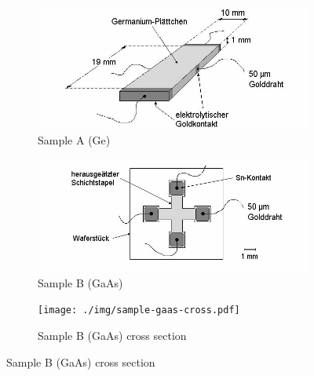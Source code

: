 \begin{figure}
	\centering
	\begin{subfigure}{0.45\textwidth}
		\centering
		\includegraphics[width=\textwidth]{./img/sample-ge.png}
		\caption{Sample A (Ge)}
		\label{fig:samples:ge}
	\end{subfigure}
	\begin{subfigure}{0.45\textwidth}
		\centering
		\includegraphics[width=\textwidth]{./img/sample-gaas-clover.png}
		\caption{Sample B (GaAs)}
		\label{fig:samples:gaas-clover}
	\end{subfigure}
  \par\bigskip
	\begin{subfigure}{0.7\textwidth}
		\centering
		\texttt{[image: ./img/sample-gaas-cross.pdf]}
		\caption{Sample B (GaAs) cross section}
		\label{fig:samples:gaas-cross}
	\end{subfigure}
\end{figure}
